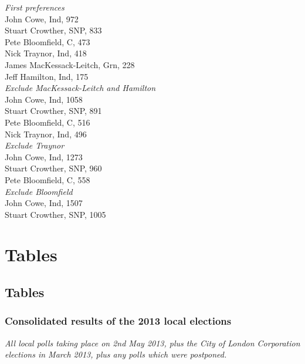 \documentclass[a4paper,openany,10pt]{book}
\begin{document}
\emph{First preferences}\\
John Cowe, Ind, 972\\
Stuart Crowther, SNP, 833\\
Pete Bloomfield, C, 473\\
Nick Traynor, Ind, 418\\
James MacKessack-Leitch, Grn, 228\\
Jeff Hamilton, Ind, 175\\




\emph{Exclude MacKessack-Leitch and Hamilton}\\
John Cowe, Ind, 1058\\
Stuart Crowther, SNP, 891\\
Pete Bloomfield, C, 516\\
Nick Traynor, Ind, 496\\




\emph{Exclude Traynor}\\
John Cowe, Ind, 1273\\
Stuart Crowther, SNP, 960\\
Pete Bloomfield, C, 558\\




\emph{Exclude Bloomfield}\\
John Cowe, Ind, 1507\\
Stuart Crowther, SNP, 1005\\


\part{Tables}

\chapter{Tables}

\section{Consolidated results of the 2013 local elections}

\emph{All local polls taking place on 2nd May 2013, plus the City of London Corporation elections in March 2013, plus any polls which were postponed.}
\end{document}
